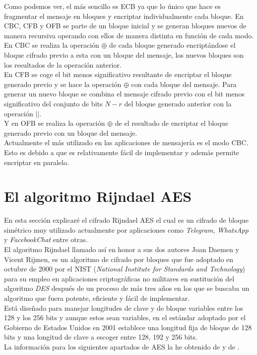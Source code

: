 \newpage
Como podemos ver, el más sencillo es ECB ya que lo único que hace es fragmentar el mensaje en bloques y encriptar individualmente cada bloque. En CBC, CFB y OFB se parte de un bloque inicial y se generan bloques nuevos de manera recursiva operando con ellos de manera distinta en función de cada modo.\\ 
En CBC se realiza la operación $\oplus$ de cada bloque generado encriptándose el bloque cifrado previo a esta con un bloque del mensaje, los nuevos bloques son los resultados de la operación anterior.\\
En CFB se coge el bit menos significativo resultante de encriptar el bloque generado previo y se hace la operación $\oplus$ con cada bloque del mensaje. Para generar un nuevo bloque se combina el mensaje cifrado previo con el bit menos significativo del conjunto de bits $N-r$ del bloque generado anterior con la operación $||$.\\
Y en OFB se realiza la operación $\oplus$ de el resultado de encriptar el bloque generado previo con un bloque del mensaje.\\
Actualmente el más utilizado en las aplicaciones de mensajería es el modo CBC. Esto es debido a que es relativamente fácil de implementar y además permite encriptar en paralelo.

\section{El algoritmo Rijndael AES}
En esta sección explicaré el cifrado Rijndael AES el cual es un cifrado de bloque simétrico muy utilizado actualmente por aplicaciones como \emph{Telegram}, \emph{WhatsApp} y \emph{FacebookChat} entre otras.\\
El algoritmo Rijndael llamado así en honor a sus dos autores Joan Daemen y Vicent Rijmen, es un algoritmo de cifrado por bloques que fue adoptado en octubre de 2000 por el NIST (\emph{National Institute for Standards and Technology}) para su empleo en aplicaciones criptográficas no militares en sustitución del algoritmo \emph{DES} después de un proceso de más tres años en los que se buscaba un algoritmo que fuera potente, eficiente y fácil de implementar.\\
Está diseñado para manejar longitudes de clave y de bloque variables entre los 128 y los 256 bits y aunque estos sean variables, en el estándar adoptado por el Gobierno de Estados Unidos en 2001 \cite{aesUsa} establece una longitud fija de bloque de 128 bits y una longitud de clave a escoger entre 128, 192 y 256 bits.\\
La información para los siguientes apartados de AES la he obtenido de \cite{En2011} y de \cite{criptografia}.\\

